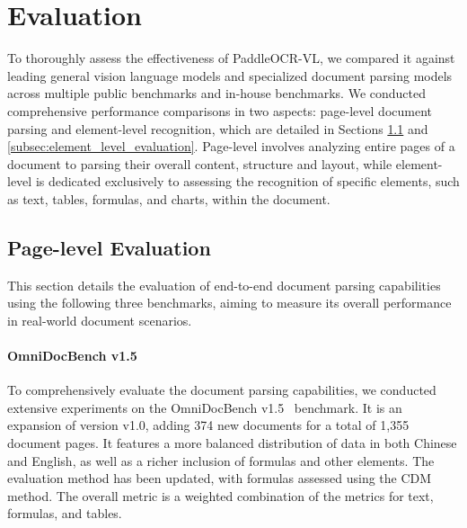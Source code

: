\documentclass[11pt, a4paper,logo,  copyright, nonumbering]{paddleocr}
\begin{document}
\section{Evaluation}

\label{sec:experiments} 

To thoroughly assess the effectiveness of PaddleOCR-VL, we compared it against leading general vision language models and specialized document parsing models across multiple public benchmarks and in-house benchmarks. We conducted comprehensive performance comparisons in two aspects: page-level document parsing and element-level recognition, which are detailed in Sections \ref{Page-level Evaluation} and \ref{subsec:element_level_evaluation}. Page-level involves analyzing entire pages of a document to parsing their overall content, structure and layout, while element-level is dedicated exclusively to assessing the recognition of specific elements, such as text, tables, formulas, and charts, within the document.



\subsection{Page-level Evaluation}
\label{Page-level Evaluation}

This section details the evaluation of end-to-end document parsing capabilities using the following three benchmarks, aiming to measure its overall performance in real-world document scenarios. 


\paragraph{OmniDocBench v1.5} To comprehensively evaluate the document parsing capabilities, we conducted extensive experiments on the OmniDocBench v1.5~\cite{niu2025mineru2} benchmark. It is an expansion of version v1.0, adding 374 new documents for a total of 1,355 document pages. It features a more balanced distribution of data in both Chinese and English, as well as a richer inclusion of formulas and other elements. The evaluation method has been updated, with formulas assessed using the CDM method. The overall metric is a weighted combination of the metrics for text, formulas, and tables. 
\end{document}
